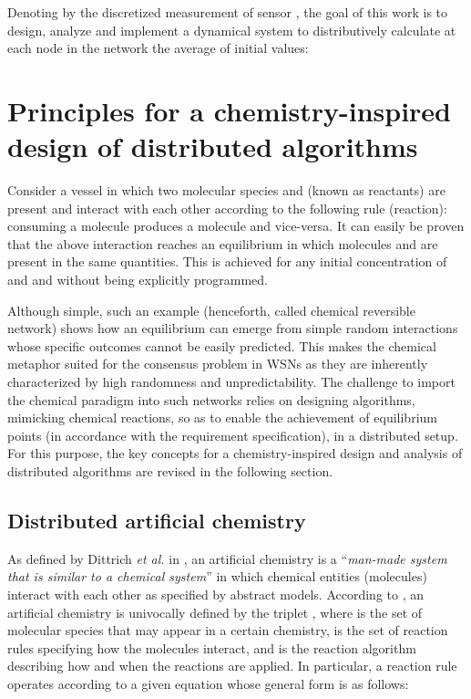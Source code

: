 \documentclass[journal]{IEEEtran}
\newcommand{\artChem}{}
\begin{document}
Denoting by  the {discretized} measurement of sensor , the goal of this work is to {design, analyze and implement} a dynamical system to distributively calculate {at each node in the network} the average of initial values:




\section{Principles for a chemistry-inspired design of distributed algorithms}
\label{sec:IntroChem}
Consider a vessel in which two molecular species  and  (known as reactants) are present and interact {with} each other according to the following rule (reaction): consuming a molecule  produces a molecule  and vice-versa. It can easily be proven that the above interaction reaches an equilibrium in which molecules  and  are present in the same quantities. This is achieved for any initial concentration of  and  and without being explicitly programmed. 

Although simple, such an example (henceforth, called chemical reversible network) shows how an equilibrium can emerge from simple {random interactions whose specific outcomes cannot be easily} predicted. This makes the chemical metaphor suited for the consensus problem in WSNs as they are inherently characterized by high randomness and unpredictability. The challenge to import the chemical paradigm into such networks relies on designing {algorithms, mimicking chemical reactions, so as to enable the achievement of equilibrium points (in accordance with the requirement specification), in a distributed setup}. For this purpose, the key concepts for a chemistry-inspired design and analysis of distributed algorithms are revised in the following section.


\subsection{Distributed artificial chemistry}\label{sec:ArtChem}
As defined by Dittrich \emph{et al.} in \cite{DiZi01}, an artificial chemistry \artChem{} is a ``\emph{man-made system that is similar to a chemical system}'' in which chemical entities (molecules) interact with each other as specified by abstract models.
According to \cite{DiZi01}, an artificial chemistry \artChem{} is univocally defined by the triplet , where  is the set of {molecular} species that may appear in a certain chemistry,  is the set of reaction rules specifying how the molecules interact, and  is the reaction algorithm describing how and when the reactions are applied. In particular, a reaction rule  operates according to a given equation whose general form is as follows:
\end{document}
